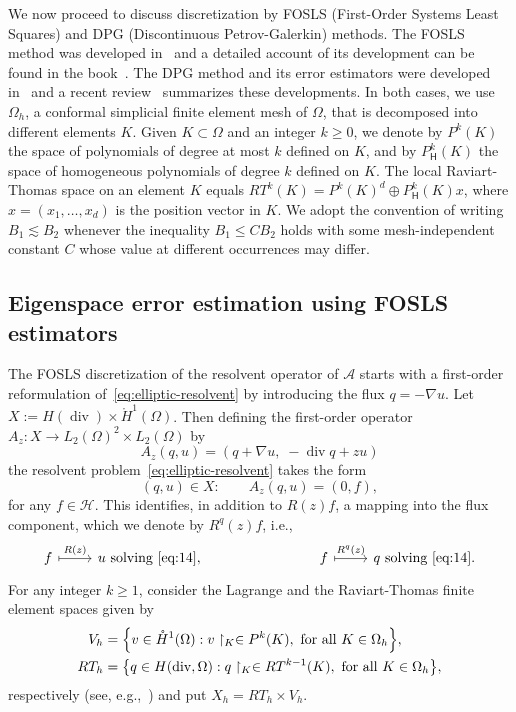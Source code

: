 \documentclass[12pt, oneside, reqno]{amsart}
\theoremstyle{remark}
\newcommand{\tForAll}{\text{ for all }}
\DeclareMathOperator{\diver}{div}
\DeclarePairedDelimiter{\set}{\{}{\}}
\newcommand{\Ac}{\mathcal{A}}
\newcommand{\Af}{{A}}
\newcommand{\Hc}{\mathcal{H}}
\begin{document}
We now proceed to discuss discretization by FOSLS (First-Order Systems
Least Squares) and DPG (Discontinuous Petrov-Galerkin) methods. The
FOSLS method was developed in~\cite{CaiEtAl1994-1, CaiEtAl1997-1} and
a detailed account of its development can be found in the
book~\cite{BocheGunzb09a}. The DPG method and its error estimators
were developed in~\cite{DemkoGopal11,
  DemkoGopalNiemi12,CarDemGop2014-1} and a recent
review~\cite{DemGop2025-1} summarizes these developments.  In both
cases, we use \(\Omega_h\), a conformal simplicial finite element mesh
of \(\Omega\), that is decomposed into different elements \(K\).
Given \(K \subset \Omega\) and an integer \(k \geq 0\), we denote by
\(P^k(K)\) the space of polynomials of degree at most \(k\) defined on
\(K\), and by \(P_\mathsf{H}^k(K)\) the space of homogeneous
polynomials of degree \(k\) defined on \(K\).  The local
Raviart-Thomas space on an element $K$ equals
\(RT^k(K) = P^k(K)^d \oplus P_\mathsf{H}^k(K) {x}\), where
\({x} = (x_1, \ldots, x_d)\) is the position vector in \(K\).  We
adopt the convention of writing $B_1 \lesssim B_2$ whenever the 
inequality $B_1 \le C B_2$ holds with some mesh-independent constant $C$
whose value at different occurrences may differ.



\subsection{Eigenspace error estimation using FOSLS estimators}
\label{ssec:FOSLS}


The FOSLS discretization of the resolvent operator of $\Ac$ starts
with a first-order reformulation of~\eqref{eq:elliptic-resolvent} by
introducing the flux $q = - \nabla u$.
Let $X:=  H(\diver) \times \mathring{H}^1(\Omega)$.
Then  defining  the first-order operator 
$  \Af_z: X \to 
  L_2(\Omega)^2 \times L_2(\Omega)
$ by 
\[
  \Af_z (q, u) = ( q + \nabla u,
  \;
  -\diver q + z u)
\]
the resolvent problem~\eqref{eq:elliptic-resolvent} takes the form
\begin{equation}
  \label{eq:14}
  (q, u) \in X: \qquad 
  \Af_z(q, u) = (0, f),
\end{equation}
for any $f \in \Hc$. This identifies, in addition to $R(z) f$, a mapping into the
flux component, which we denote by $R^q(z) f$, i.e., 
\[
  \begin{tikzcd}
    f %
    \ar[r, mapsto, "R(z)"]
    &
    {u\text{ solving~\eqref{eq:14}}},
    &
    \qquad
    &
    f
    \ar[r, mapsto, "R^q(z)"]
    & {q\text{ solving~\eqref{eq:14}.}}
  \end{tikzcd}
\]
For any integer 
\(k \geq 1\), consider the Lagrange and the
Raviart-Thomas finite element spaces given by
\begin{align*}
  V_h & =  \set*{
    v \in \mathring{H}^1(\Omega) : v\restriction_K \in P^k (K),
    \tForAll K \in \Omega_h
  }, \\
  RT_h & = \set*{
    q \in H(\diver,\Omega) : q\restriction_K \in RT^{k-1} (K),
    \tForAll K \in \Omega_h
  },
\end{align*}
respectively (see, e.g.,~\cite{ErnGue2021-2, BreFor2012-1}) and put
\(X_h = RT_h \times V_h\). %
\end{document}
